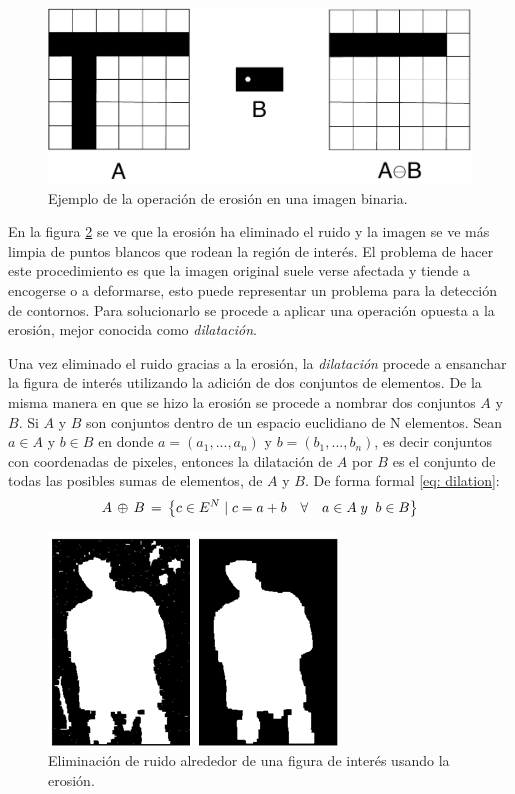\begin{figure}
\centering 
\includegraphics[scale=0.7]{images/erosion_diagram.pdf}
\caption{Ejemplo de la operación de erosión en una imagen binaria.}
\label{fig:erosion_diagram}
\end{figure}

En la figura \ref{fig:erosion_example} se ve que la erosión ha eliminado el ruido y la imagen se ve más limpia de puntos blancos que rodean la región de interés. El problema de hacer este procedimiento es que la imagen original suele verse afectada y tiende a encogerse o a deformarse, esto puede representar un problema para la detección de contornos. Para solucionarlo se procede a aplicar una operación opuesta a la erosión, mejor conocida como \textit{dilatación}.

Una vez eliminado el ruido gracias a la erosión, la \textit{dilatación} procede a ensanchar la figura de interés utilizando la adición de dos conjuntos de elementos. De la misma manera en que se hizo la erosión se procede a nombrar dos conjuntos $A$ y $B$. Si $A$ y $B$ son conjuntos dentro de un espacio euclidiano de N elementos. Sean $a \in A$ y $b \in B$ en donde $a=(a_1, ... ,a_n)$ y $b=(b_1,...,b_n)$, es decir conjuntos con coordenadas de pixeles, entonces la dilatación de $A$ por $B$ es el conjunto de todas las posibles sumas de elementos, de $A$ y $B$. De forma formal \ref{eq: dilation}:
\begin{equation}
A\thinspace\oplus\thinspace B\thinspace=\thinspace \left \{ c \in E^N  \mid c=a+b \quad\forall \quad a \in A \; y\; \; b \in B\right \}
\label{eq: dilation}
\end{equation}


\begin{figure}
\centering
\includegraphics[scale=1]{images/erosion_example.png}
\caption{Eliminación de ruido alrededor de una figura de interés usando la erosión.}
\label{fig:erosion_example}
\end{figure}

